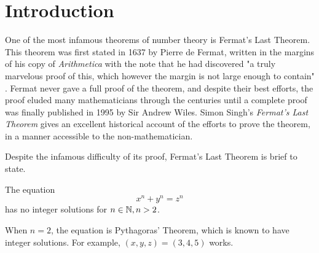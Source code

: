 \chapter{Introduction}\label{sec-introduction}
One of the most infamous theorems of number theory is Fermat's Last Theorem. This theorem was first stated in 1637 by Pierre de Fermat, written in the margins of his copy of \textit{Arithmetica} with the note that he had discovered "a truly marvelous proof of this, which however the margin is not large enough to contain" \cite{Heath}. Fermat never gave a full proof of the theorem, and despite their best efforts, the proof eluded many mathematicians through the centuries until a complete proof was finally published in 1995 by Sir Andrew Wiles. Simon Singh's \textit{Fermat's Last Theorem} \cite{Singh} gives an excellent historical account of the efforts to prove the theorem, in a manner accessible to the non-mathematician. 

Despite the infamous difficulty of its proof, Fermat's Last Theorem is brief to state.
\begin{theorem}\label{Fermat-Theorem}
The equation
\begin{equation}\label{Fermat}
    x^n+y^n=z^n
\end{equation}
has no integer solutions for $n\in \mathbb{N},n>2$.
\end{theorem}

When $n=2$, the equation is Pythagoras' Theorem, which is known to have integer solutions. For example, $(x,y,z)=(3,4,5)$ works. 

